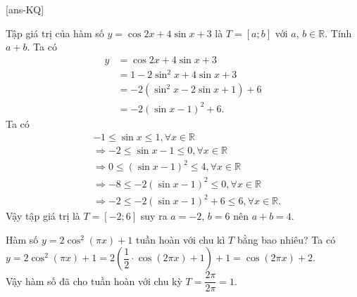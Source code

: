 

\caukq

[ans-KQ]
\begin{ex}%
Tập giá trị của hàm số $y=\cos 2x+ 4 \sin x +3$ là $T=[a;b]$ với $a$, $b \in \mathbb{R}$. Tính $a+b$.
\loigiai
{Ta có 
\begin{align*}
y&=\cos 2x+ 4 \sin x +3 \\
&=1 -2 \sin ^2 x+4 \sin x +3 \\
&= -2 (\sin^2 x -2\sin x +1)+6\\
&=-2(\sin x -1)^2+6.
\end{align*} 
Ta có
\begin{align*}
	&-1 \le \sin x \le 1, \forall x \in \mathbb{R}\\
	&\Rightarrow -2 \le \sin x -1 \le 0, \forall x \in \mathbb{R}\\
	&\Rightarrow 0 \le (\sin x -1)^2 \le 4, \forall x \in \mathbb{R}\\
	&\Rightarrow -8 \le -2(\sin x -1)^2 \le 0, \forall x \in \mathbb{R}\\
	&\Rightarrow -2 \le -2(\sin x -1)^2+6 \le 6, \forall x \in \mathbb{R}.
\end{align*}
Vậy tập giá trị là $T=[-2;6]$ suy ra $a=-2$, $b=6$ nên $a+b=4$.
}
\end{ex}
\begin{ex}%
Hàm số $y=2 \cos^2 (\pi x)+1$ tuần hoàn với chu kì $T$ bằng bao nhiêu?
	\loigiai
	{Ta có $y=2 \cos^2 (\pi x)+1=2 \left(\dfrac{1}{2} \cdot  \cos (2 \pi x)+1 \right)+1=\cos (2 \pi x)+2$.\\
	Vậy hàm số đã cho tuần hoàn với chu kỳ $T=\dfrac{2 \pi}{2 \pi}=1$.
	}
\end{ex}
